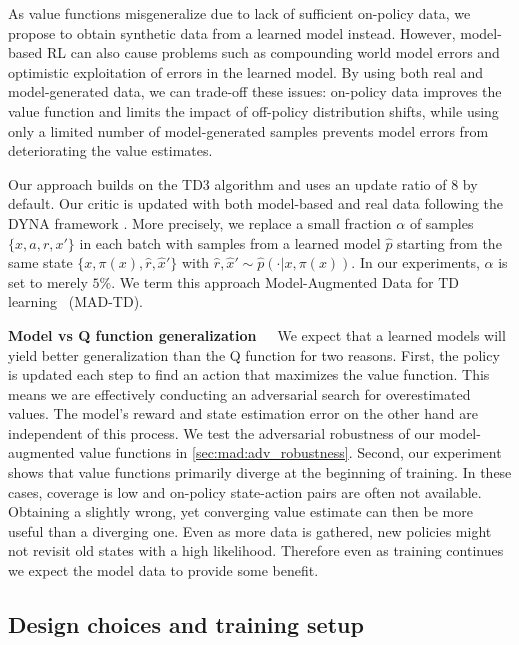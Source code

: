 As value functions misgeneralize due to lack of sufficient on-policy data, we propose to obtain synthetic data from a learned model instead.
However, model-based RL can also cause problems such as compounding world model errors and optimistic exploitation of errors in the learned model. 
By using both real and model-generated data, we can trade-off these issues: on-policy data improves the value function and limits the impact of off-policy distribution shifts, while using only a limited number of model-generated samples prevents model errors from deteriorating the value estimates. 

Our approach builds on the TD3 algorithm \parencite{fujimoto2018addressing} and uses an update ratio of 8 by default. 
Our critic is updated with both model-based and real data following the DYNA framework \parencite{dyna}.
More precisely, we replace a small fraction $\alpha$ of samples $\{x,a,r,x'\}$ in each batch with samples from a learned model $\hat{p}$ starting from the same state $\{x, \pi(x), \hat{r} ,\hat{x}'\}$ with $\hat{r}, \hat{x}' \sim \hat{p}(\cdot|x, \pi(x))$. In our experiments, $\alpha$ is set to merely $5\%$.
We term this approach Model-Augmented Data for TD learning ~(MAD-TD).%

\textbf{Model vs Q function generalization}~~~We expect that a learned models will yield better generalization than the Q function for two reasons.
First, the policy is updated each step to find an action that maximizes the value function.
This means we are effectively conducting an adversarial search for overestimated values.
The model's reward and state estimation error on the other hand are independent of this process.
We test the adversarial robustness of our model-augmented value functions in \autoref{sec:mad:adv_robustness}.
Second, our experiment shows that value functions primarily diverge at the beginning of training.
In these cases, coverage is low and on-policy state-action pairs are often not available.
Obtaining a slightly wrong, yet converging value estimate can then be more useful than a diverging one. 
Even as more data is gathered, new policies might not revisit old states with a high likelihood.
Therefore even as training continues we expect the model data to provide some benefit.

\subsection{Design choices and training setup}
\label{sec:mad:method}


